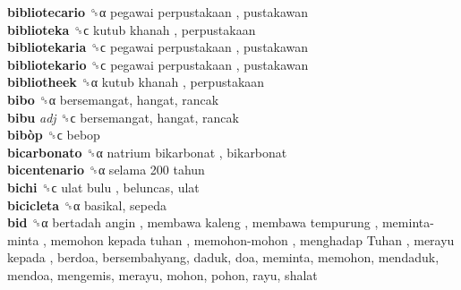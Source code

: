\textbf{bibliotecario} ␝α   pegawai perpustakaan , pustakawan  \\
\textbf{biblioteka} ␝ϲ   kutub khanah , perpustakaan  \\
\textbf{bibliotekaria} ␝ϲ   pegawai perpustakaan , pustakawan  \\
\textbf{bibliotekario} ␝ϲ   pegawai perpustakaan , pustakawan  \\
\textbf{bibliotheek} ␝α   kutub khanah , perpustakaan  \\
\textbf{bibo} ␝α  bersemangat, hangat, rancak  \\
\textbf{bibu} \emph{adj}  ␝ϲ  bersemangat, hangat, rancak  \\
\textbf{bibòp} ␝ϲ  bebop  \\
\textbf{bicarbonato} ␝α   natrium bikarbonat , bikarbonat  \\
\textbf{bicentenario} ␝α   selama 200 tahun   \\
\textbf{bichi} ␝ϲ   ulat bulu , beluncas, ulat  \\
\textbf{bicicleta} ␝α  basikal, sepeda  \\
\textbf{bid} ␝α   bertadah angin ,  membawa kaleng ,  membawa tempurung ,  meminta-minta ,  memohon kepada tuhan ,  memohon-mohon ,  menghadap Tuhan ,  merayu kepada , berdoa, bersembahyang, daduk, doa, meminta, memohon, mendaduk, mendoa, mengemis, merayu, mohon, pohon, rayu, shalat  \\
